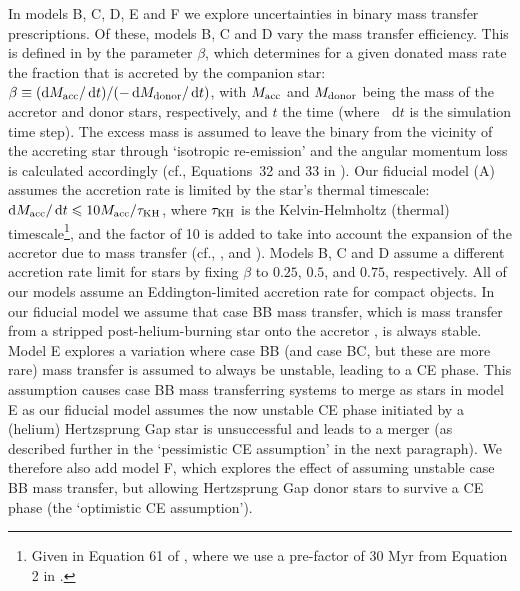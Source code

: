 \documentclass[fleqn,usenatbib]{mnras}
\newcommand\COMPAS{{\sc{COMPAS }}}
\newcommand*\diff{\mathop{}\!\mathrm{d}}
\begin{document}
In models B, C, D, E and F we explore uncertainties in binary mass transfer prescriptions.  Of these, models B, C and D vary the mass transfer efficiency. 
This is defined in \COMPAS by the parameter $\beta$, which determines for a given donated mass rate the fraction that is accreted by the companion star: $\beta \equiv (\diff M_{\rm{acc}} / \diff t) / (- \diff M_{\rm{donor}} / \diff t)$, with $M_{\rm{acc}}$ and $M_{\rm{donor}}$ being the mass of the accretor and donor stars, respectively, and $t$ the time (where $\diff t$ is the simulation time step).  
The excess mass is assumed to leave the binary from the vicinity of the accreting star through `isotropic re-emission'  \citep[e.g.,][]{1975MmSAI..46..217M,1991PhR...203....1B,1997A&A...327..620S} and the angular momentum loss is calculated accordingly (cf., Equations~32 and 33 in \citealt{2008ApJS..174..223B}).  
Our fiducial model (A) assumes the accretion rate  is limited by  the star's thermal  timescale: $\diff  M_{\rm{acc}} / \diff t \leq 10 M_{\rm{acc}} / \tau_{\rm{KH}}$, where $\tau_{\rm{KH}}$ is the Kelvin-Helmholtz (thermal) timescale\footnote{Given in Equation 61 of \citet{2002MNRAS.329..897H}, where we use a pre-factor of 30 Myr from Equation 2 in \citet{KalogeraWebbink:1996}.}, and the factor of 10 is added to take into account the expansion of the accretor due to mass transfer (cf., \citealt{1972AcA....22...73P}, \citealt{2002MNRAS.329..897H} and \citealt{2015ApJ...805...20S}).  
Models B, C and D assume a different accretion rate limit for stars by fixing $\beta$ to $0.25$, $0.5$, and $0.75$, respectively. 
All of our models assume an Eddington-limited accretion rate for compact objects. In our fiducial model we assume that case BB mass transfer, which is mass transfer from a stripped post-helium-burning star onto the accretor \citep{1981A&A....96..142D}, is always stable. 
Model E explores a variation where case BB (and case BC, but these are more rare) mass transfer is assumed to always be unstable, leading to a \ac{CE} phase.  This assumption causes case BB mass transferring systems to merge as stars in model E as our fiducial model assumes the now unstable \ac{CE} phase initiated by a (helium) Hertzsprung Gap star is unsuccessful and leads to a merger (as described further in the `pessimistic \ac{CE} assumption' in the next paragraph).  
We therefore also add model F, which explores the effect of assuming unstable case BB mass transfer, but allowing Hertzsprung Gap donor stars to survive a \ac{CE} phase (the `optimistic \ac{CE} assumption').
\end{document}
